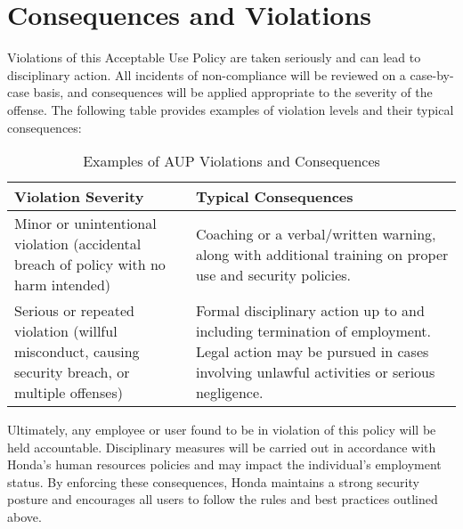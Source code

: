 \section{Consequences and Violations}\label{sec:consequences}
Violations of this Acceptable Use Policy are taken seriously and can lead to disciplinary action. All incidents of non-compliance will be reviewed on a case-by-case basis, and consequences will be applied appropriate to the severity of the offense. The following table provides examples of violation levels and their typical consequences:
\begin{table}[h!]
\centering
\begin{tabular}{| p{6.5cm} | p{7.5cm} |}
\hline
\textbf{Violation Severity} & \textbf{Typical Consequences} \\
\hline
Minor or unintentional violation (accidental breach of policy with no harm intended) & Coaching or a verbal/written warning, along with additional training on proper use and security policies. \\
\hline
Serious or repeated violation (willful misconduct, causing security breach, or multiple offenses) & Formal disciplinary action up to and including termination of employment. Legal action may be pursued in cases involving unlawful activities or serious negligence. \\
\hline
\end{tabular}
\caption{Examples of AUP Violations and Consequences}\label{tab:violations}
\end{table}

Ultimately, any employee or user found to be in violation of this policy will be held accountable. Disciplinary measures will be carried out in accordance with Honda's human resources policies and may impact the individual's employment status. By enforcing these consequences, Honda maintains a strong security posture and encourages all users to follow the rules and best practices outlined above.



